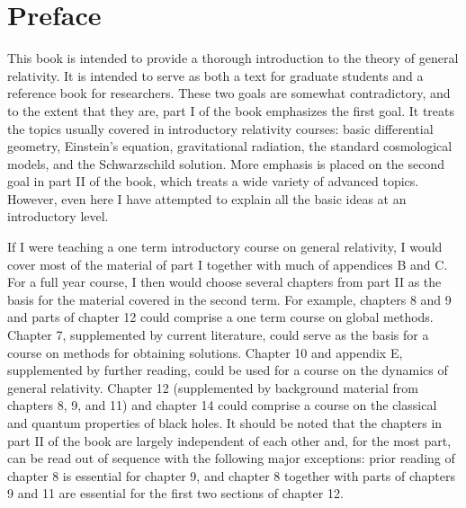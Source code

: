 
\section*{Preface}

This book is intended to provide a thorough introduction to the theory of general
relativity. It is intended to serve as both a text for graduate students and a
reference book for researchers. These two goals are somewhat contradictory, and
to the extent that they are, part I of the book emphasizes the first goal. It treats
the topics usually covered in introductory relativity courses: basic differential
geometry, Einstein's equation, gravitational radiation, the standard cosmological
models, and the Schwarzschild solution. More emphasis is placed on the second goal
in part II of the book, which treats a wide variety of advanced topics. However,
even here I have attempted to explain all the basic ideas at an introductory level.

If I were teaching a one term introductory course on general relativity, I would
cover most of the material of part I together with much of appendices B and C. For
a full year course, I then would choose several chapters from part II as the basis
for the material covered in the second term. For example, chapters 8 and 9 and
parts of chapter 12 could comprise a one term course on global methods. Chapter 7,
supplemented by current literature, could serve as the basis for a course on methods
for obtaining solutions. Chapter 10 and appendix E, supplemented by further
reading, could be used for a course on the dynamics of general relativity. Chapter
12 (supplemented by background material from chapters 8, 9, and 11) and chapter
14 could comprise a course on the classical and quantum properties of black holes.
It should be noted that the chapters in part II of the book are largely independent
of each other and, for the most part, can be read out of sequence with the following
major exceptions: prior reading of chapter 8 is essential for chapter 9, and chapter
8 together with parts of chapters 9 and 11 are essential for the first two sections
of chapter 12.

